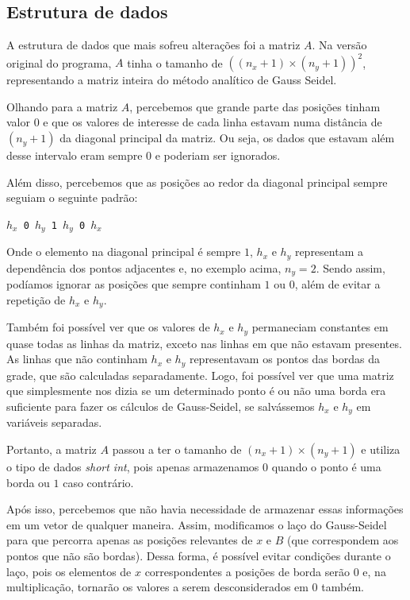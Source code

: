 \documentclass[12pt]{article}
\begin{document}
	\subsection{Estrutura de dados}
	A estrutura de dados que mais sofreu alterações foi a matriz $A$.
	Na versão original do programa, $A$ tinha o tamanho de $((n_x+1)\times(n_y+1))^2$, representando a matriz inteira do método analítico de Gauss Seidel.
	
	Olhando para a matriz $A$, percebemos que grande parte das posições tinham valor $0$ e que os valores de interesse de cada linha estavam numa distância de $(n_y+1)$ da diagonal principal da matriz.
	Ou seja, os dados que estavam além desse intervalo eram sempre $0$ e poderiam ser ignorados.
	
	Além disso, percebemos que as posições ao redor da diagonal principal sempre seguiam o seguinte padrão:
	
	\begin{center}
		\texttt{$h_x$ 0 $h_y$ 1 $h_y$ 0 $h_x$}
	\end{center}
	
	Onde o elemento na diagonal principal é sempre $1$, $h_x$ e $h_y$ representam a dependência dos pontos adjacentes e, no exemplo acima, $n_y=2$.
	Sendo assim, podíamos ignorar as posições que sempre continham $1$ ou $0$, além de evitar a repetição de $h_x$ e $h_y$.
	
	Também foi possível ver que os valores de $h_x$ e $h_y$ permaneciam constantes em quase todas as linhas da matriz, exceto nas linhas em que não estavam presentes.
	As linhas que não continham $h_x$ e $h_y$ representavam os pontos das bordas da grade, que são calculadas separadamente.
	Logo, foi possível ver que uma matriz que simplesmente nos dizia se um determinado ponto é ou não uma borda era suficiente para fazer os cálculos de Gauss-Seidel, se salvássemos $h_x$ e $h_y$ em variáveis separadas.
	
	Portanto, a matriz $A$ passou a ter o tamanho de $(n_x+1)\times(n_y+1)$ e utiliza o tipo de dados \emph{short int}, pois apenas armazenamos $0$ quando o ponto é uma borda ou $1$ caso contrário.
	
	Após isso, percebemos que não havia necessidade de armazenar essas informações em um vetor de qualquer maneira.
	Assim, modificamos o laço do Gauss-Seidel para que percorra apenas as posições relevantes de $x$ e $B$ (que correspondem aos pontos que não são bordas).
	Dessa forma, é possível evitar condições durante o laço, pois os elementos de $x$ correspondentes a posições de borda serão $0$ e, na multiplicação, tornarão os valores a serem desconsiderados em $0$ também.
	
\end{document}
